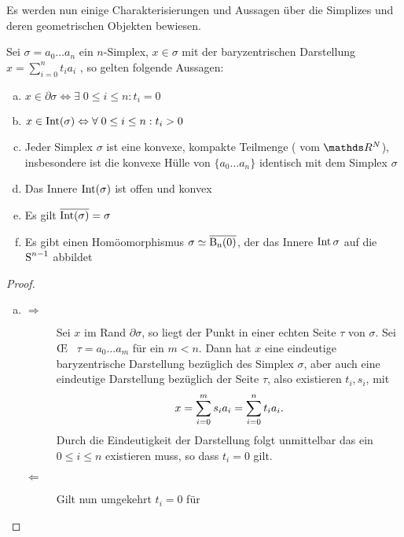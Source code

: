 
Es werden nun einige Charakterisierungen und Aussagen über die
Simplizes und deren geometrischen Objekten bewiesen.

\begin{Satz}
  \normalfont Sei $\sigma = a_0 \ldots a_n $ ein $n$-Simplex,
  $x \in \sigma$ mit der baryzentrischen Darstellung
  $x=\sum\limits_{i=0}^n t_i a_i$ , so gelten folgende Aussagen:
  \begin{enumerate}[(a)]
  \item
    $x \in \partial\sigma \Leftrightarrow \exists \; 0 \leq i \leq n :
    t_i = 0$
  \item
    $x \in \Int(\sigma) \Leftrightarrow \forall \; 0 \leq i \leq n :
    t_i > 0$
  \item Jeder Simplex $\sigma$ ist eine konvexe, kompakte Teilmenge (
    vom $\R^N$), insbesondere ist die konvexe Hülle von
    $\{ a_0 \ldots a_n \}$ identisch mit dem Simplex $\sigma$
  \item Das Innere $\Int(\sigma)$ ist offen und konvex
  \item Es gilt $\overline{\Int(\sigma)} = \sigma$
  \item Es gibt einen Homöomorphismus $\sigma \simeq \Bn$, der das
    Innere $\Int{\sigma}$ auf die $\Sp^{n-1}$ abbildet
  \end{enumerate}
  \begin{proof}
    \begin{enumerate}[a):]
    \item
      \begin{description}
      \item[\glqq $\Rightarrow$\grqq] Sei $x$ im Rand
        $\partial\sigma$, so liegt der Punkt in einer echten Seite
        $\tau$ von $\sigma$. Sei \OE~ $\tau = a_0 \ldots a_m$ für ein
        $m < n$. Dann hat $x$ eine eindeutige baryzentrische
        Darstellung bezüglich des Simplex $\sigma$, aber auch eine
        eindeutige Darstellung bezüglich der Seite $\tau$, also
        existieren $t_i,s_i$, mit
        \begin{gather*}
          x = \sp{0}{m} s_i a_i = \sp{0}{n} t_i a_i .
        \end{gather*}
        Durch die Eindeutigkeit der Darstellung folgt unmittelbar das
        ein $0 \leq i \leq n$ existieren muss, so dass $t_i = 0$ gilt.
      \item[\glqq $\Leftarrow$ \grqq] Gilt nun umgekehrt $t_i = 0$ für

\end{description}
\end{enumerate}
\end{proof}
\end{Satz}
